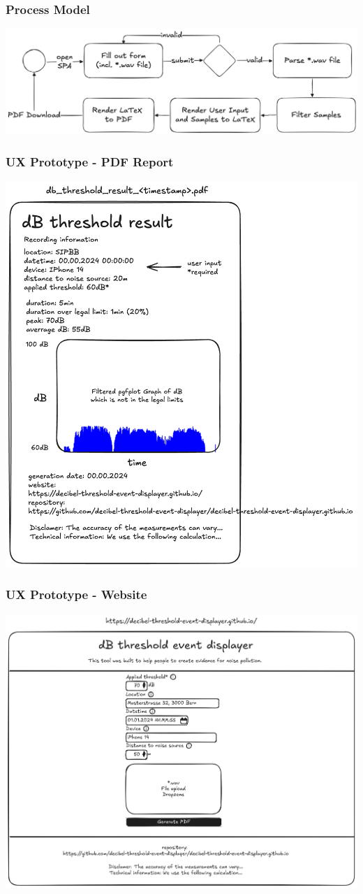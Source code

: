 \begin{frame}
    \frametitle{Process Model}
    \centering
    \includegraphics[width=0.85\linewidth]{../assets/process_model.png}
\end{frame}

\begin{frame}
    \frametitle{UX Prototype - PDF Report}
    \centering
    \includegraphics[width=0.45\linewidth]{../assets/ux_prototype.png}
\end{frame}

\begin{frame}
    \frametitle{UX Prototype - Website}
    \centering
    \includegraphics[width=0.65\linewidth]{../assets/ux_prototype_website.png}
\end{frame}

